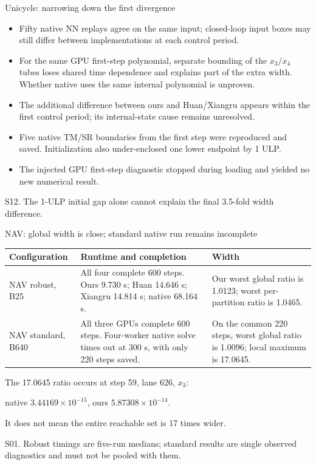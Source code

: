 \documentclass[aspectratio=169,11pt]{beamer}
\newcommand{\src}[1]{\par\vfill{\fontsize{7}{9}\selectfont\color{gray}#1\par}}
\begin{document}
\begin{frame}[t]{Unicycle: narrowing down the first divergence}
\relax
\relax
\begin{itemize}
\item Fifty native NN replays agree on the same input; closed-loop input boxes may still differ between implementations at each control period.
\item For the same GPU first-step polynomial, separate bounding of the \(x_3/x_4\) tubes loses shared time dependence and explains part of the extra width. Whether native uses the same internal polynomial is unproven.
\item The additional difference between ours and Huan/Xiangru appears within the first control period; its internal-state cause remains unresolved.
\item Five native TM/SR boundaries from the first step were reproduced and saved. Initialization also under-enclosed one lower endpoint by 1 ULP.
\item The injected GPU first-step diagnostic stopped during loading and yielded no new numerical result.
\end{itemize}
\src{S12. The 1-ULP initial gap alone cannot explain the final 3.5-fold width difference.}
\end{frame}

\begin{frame}[t]{NAV: global width is close; standard native run remains incomplete}
\relax
\relax
{\small\renewcommand{\arraystretch}{1.18}\noindent\begin{tabularx}{\linewidth}{@{}p{3.0cm}p{6.0cm}X@{}}\toprule
\textbf{Configuration} & \textbf{Runtime and completion} & \textbf{Width}\\\midrule
NAV robust, B25 & All four complete 600 steps. Ours 9.730 s; Huan 14.646 s; Xiangru 14.814 s; native 68.164 s. & Our worst global ratio is 1.0123; worst per-partition ratio is 1.0465.\\
NAV standard, B640 & All three GPUs complete 600 steps. Four-worker native solve times out at 300 s, with only 220 steps saved. & On the common 220 steps, worst global ratio is 1.0096; local maximum is 17.0645.\\
\bottomrule\end{tabularx}\par{}}\vspace{0.3cm}The 17.0645 ratio occurs at step 59, lane 626, \(x_3\):\par{}native \(3.44169\times10^{-15}\), ours \(5.87308\times10^{-14}\).\par{}It does not mean the entire reachable set is 17 times wider.
\src{S01. Robust timings are five-run medians; standard results are single observed diagnostics and must not be pooled with them.}
\end{frame}
\end{document}
